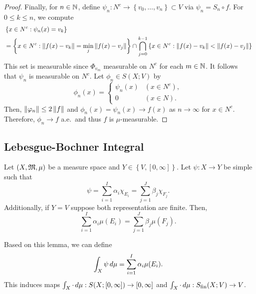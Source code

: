 \documentclass[a4paper]{article}
\begin{document}
\begin{proof}
  Finally, for $n \in \mathbb{N}$, define $\psi_n: N^c \to \left\{ v_0, \dots, v_n
  \right\} \subset V$ via $\psi_n = S_n \circ f$. For $0 \leq k \leq n$,
  we compute
  \[
    \begin{aligned}
       &
      \left\{ x \in N^c: \psi_n(x) = v_k \right\} \\
       & = \left\{ x \in N^c:
      \left\lVert f(x) - v_k\right\rVert = \min_j \left\lVert f(x) - v_j\right\rVert \right\}
      \cap \bigcap_{j=0}^{k-1}
      \left\{ x \in N^c:
      \left\lVert f(x) - v_k\right\rVert < \left\lVert f(x) - v_j\right\rVert \right\}
    \end{aligned}
  \]
  This set is measurable since $\Phi_{v_m}$ measurable on $N^c$ for each
  $m \in \mathbb{N}$. It follows that $\psi_n$ is measurable on $N^c$. Let $\phi_n
  \in S(X; V)$ by
  \[
    \phi_n(x) = \begin{cases}
      \psi_n(x) & (x \in N^c), \\
      0         & (x \in N).
    \end{cases}
  \]
  Then, $\left\lVert \varphi_n\right\rVert \leq 2\left\lVert f\right\rVert$ and $\phi_n(x) = \psi_n(x) \to
  f(x)$ as $n \to \infty$ for $x \in N^c$. Therefore, $\phi_n \to f$ a.e.\
  and thus $f$ is $\mu$-measurable.

\end{proof}

\subsection{Lebesgue-Bochner Integral}

\begin{lemma}
  Let $(X, \mathfrak{M}, \mu)$ be a measure space and $Y \in \left\{ V, [0, \infty]
    \right\}$. Let $\psi: X \to Y$ be simple such that
  \[
    \psi = \sum_{i=1}^I \alpha_i \chi_{E_i}
    = \sum_{j=1}^J \beta_j \chi_{F_j}.
  \]
  Additionally, if $Y = V$ suppose both representation are finite. Then,
  \[
    \sum_{i=1}^I \alpha_i \mu(E_i) = \sum_{j=1}^J
    \beta_j \mu(F_j).
  \]

  Based on this lemma, we can define
  \[
    \int_X \psi \, d\mu = \sum_{i=1}^I \alpha_i \mu(E_i).
  \]
  This induces maps $\int_X \cdot \, d \mu: S(X; [0, \infty]) \to [0,
  \infty]$ and $\int_X \cdot \, d \mu : S_{\text{fin}}(X; V) \to V$.
\end{lemma}
\end{document}
